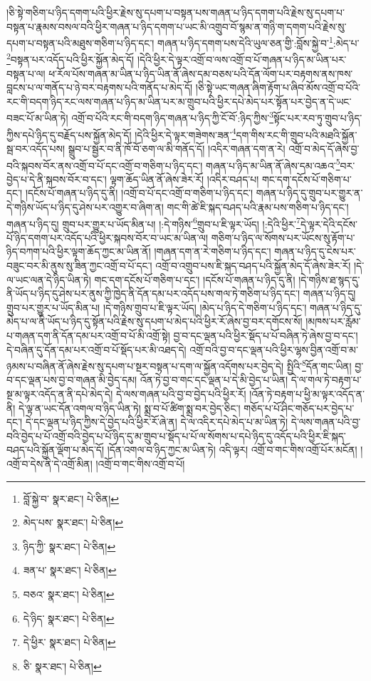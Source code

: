 །ཅི་སྟེ་གཅིག་པ་ཉིད་དགག་པའི་ཕྱིར་རྗེས་སུ་དཔག་པ་བསྟན་པས་གཞན་པ་ཉིད་དགག་པའི་རྗེས་སུ་དཔག་པ་བསྟན་པ་རྣམས་བསལ་བའི་ཕྱིར་གཞན་པ་ཉིད་དགག་པ་ཡང་མི་འགྲུབ་བོ་སྙམ་ན་གཉི་ག་དགག་པའི་རྗེས་སུ་དཔག་པ་བསྟན་པའི་མཐུས་གཅིག་པ་ཉིད་དང་། གཞན་པ་ཉིད་དགག་པས་དེའི་ཡུལ་ཅན་གྱི་:བློས་སྐྱེ་བ་\footnote{བློ་སྐྱེ་བ་  སྣར་ཐང་།  པེ་ཅིན། }:མེད་པ་\footnote{མེད་པས་  སྣར་ཐང་།  པེ་ཅིན། }བསྟན་པར་འདོད་པའི་ཕྱིར་སྐྱོན་མེད་དོ། །དེའི་ཕྱིར་དེ་ལྟར་འགྲོ་བ་ལས་འགྲོ་བ་པོ་གཞན་པ་ཉིད་མ་ཡིན་པར་བསྟན་པ་ལ། ཕ་རོལ་པོས་གཞན་མ་ཡིན་པ་ཉིད་ཡིན་ནོ་ཞེས་དམ་བཅས་པའི་དོན་ལོག་པར་བརྟགས་ནས་ཁས་བླངས་པ་ལ་གནོད་པ་ཉེ་བར་བརྟགས་པའི་གནོད་པ་མེད་དོ། །ཅི་སྟེ་ཡང་གཞན་ཞིག་རྟོག་པ་ཞིབ་མོས་འགྲོ་བ་པོའི་རང་གི་བདག་ཉིད་རང་ལས་གཞན་པ་ཉིད་མ་ཡིན་པར་མ་གྲུབ་པའི་ཕྱིར་དཔེ་མེད་པར་སྟོན་པར་བྱེད་ན་དེ་ཡང་བཟང་པོ་མ་ཡིན་ཏེ། འགྲོ་བ་པོའི་རང་གི་བདག་ཉིད་གཞན་པ་ཉིད་ཀྱི་ངོ་བོ་:ཉིད་ཀྱིས་\footnote{ཉིད་ཀྱི་  སྣར་ཐང་།  པེ་ཅིན། }སྟོང་པར་རབ་ཏུ་གྲུབ་པ་ཉིད་ཀྱིས་དཔེ་ཉིད་དུ་བརྗོད་པས་སྐྱོན་མེད་དོ། །དེའི་ཕྱིར་དེ་ལྟར་གཟེགས་ཟན་\footnote{ཟན་པ་  སྣར་ཐང་།  པེ་ཅིན། }དག་གིས་རང་གི་གྲུབ་པའི་མཐའི་སྐྱོན་སྦ་བར་འདོད་པས། སྒྲུབ་པ་སྦྱར་བ་ནི་ཁོ་བོ་ཅག་ལ་མི་གནོད་དོ། །འདིར་གཞན་དག་ན་རེ། འགྲོ་བ་མེད་དོ་ཞེས་བྱ་བའི་སྐབས་བོར་ནས་འགྲོ་བ་པོ་དང་འགྲོ་བ་གཅིག་པ་ཉིད་དང་། གཞན་པ་ཉིད་མ་ཡིན་ནོ་ཞེས་དམ་འཆའ་\footnote{བཅའ་  སྣར་ཐང་།  པེ་ཅིན། }བར་བྱེད་པ་དེ་ནི་སྐབས་བོར་བ་དང་། ལྟག་ཆོད་ཡིན་ནོ་ཞེས་ཟེར་རོ། །འདིར་བཤད་པ། གང་དག་དངོས་པོ་གཅིག་པ་དང་། །དངོས་པོ་གཞན་པ་ཉིད་དུ་ནི། །འགྲོ་བ་པོ་དང་འགྲོ་བ་གཅིག་པ་ཉིད་དང་། གཞན་པ་ཉིད་དུ་གྲུབ་པར་གྱུར་ན་དེ་གཉིས་ཡོད་པ་ཉིད་དུ་ཤེས་པར་འགྱུར་བ་ཞིག་ན། གང་གི་ཚེ་ཇི་སྐད་བཤད་པའི་རྣམ་པས་གཅིག་པ་ཉིད་དང་། གཞན་པ་ཉིད་དུ། གྲུབ་པར་གྱུར་པ་ཡོད་མིན་པ། །:དེ་གཉིས་\footnote{དེ་ཉིད་  སྣར་ཐང་།  པེ་ཅིན། }གྲུབ་པ་ཇི་ལྟར་ཡོད། །:དེའི་ཕྱིར་\footnote{དེ་ཕྱིར་  སྣར་ཐང་།  པེ་ཅིན། }དེ་ལྟར་དེའི་དངོས་པོ་ཉིད་དགག་པར་འདོད་པའི་ཕྱིར་སྐབས་བོར་བ་ཡང་མ་ཡིན་ལ། གཅིག་པ་ཉིད་ལ་སོགས་པར་ཡོངས་སུ་རྟོག་པ་ཉིད་བཀག་པའི་ཕྱིར་ལྟག་ཆོད་ཀྱང་མ་ཡིན་ནོ། །གཞན་དག་ན་རེ་གཅིག་པ་ཉིད་དང་། གཞན་པ་ཉིད་དུ་ངེས་པར་བཟུང་བར་མི་ནུས་སུ་ཟིན་ཀྱང་འགྲོ་བ་པོ་དང་། འགྲོ་བ་འགྲུབ་པས་ཇི་སྐད་བཤད་པའི་སྐྱོན་མེད་དོ་ཞེས་ཟེར་རོ། །དེ་ལ་ཡང་ལན་དེ་ཉིད་ཡིན་ཏེ། གང་དག་དངོས་པོ་གཅིག་པ་དང་། །དངོས་པོ་གཞན་པ་ཉིད་དུ་ནི། །དེ་གཉིས་ཐ་སྙད་དུ་ནི་ཡོད་པ་ཉིད་དུ་ཤེས་པར་ནུས་ཀྱི་ཁྱེད་ནི་དོན་དམ་པར་འདོད་པས་གལ་ཏེ་གཅིག་པ་ཉིད་དང་། གཞན་པ་ཉིད་དུ། གྲུབ་པར་གྱུར་པ་ཡོད་མིན་པ། །དེ་གཉིས་གྲུབ་པ་ཇི་ལྟར་ཡོད། །མེད་པ་ཉིད་དེ་གཅིག་པ་ཉིད་དང་། གཞན་པ་ཉིད་དུ་མེད་པ་ལ་ནི་ཡོད་པ་ཉིད་དུ་སྟོན་པའི་རྗེས་སུ་དཔག་པ་མེད་པའི་ཕྱིར་རོ་ཞེས་བྱ་བར་དགོངས་སོ། །མཁས་པར་རློམ་པ་གཞན་དག་ནི་དོན་དམ་པར་འགྲོ་བ་པོ་མི་འགྲོ་སྟེ། བྱ་བ་དང་ལྡན་པའི་ཕྱིར་སྡོད་པ་པོ་བཞིན་ཏེ་ཞེས་བྱ་བ་དང་། དེ་བཞིན་དུ་དོན་དམ་པར་འགྲོ་བ་པོ་སྡོད་པར་མི་འཐད་དེ། འགྲོ་བའི་བྱ་བ་དང་ལྡན་པའི་ཕྱིར་ལྷས་བྱིན་འགྲོ་བ་མ་ཉམས་པ་བཞིན་ནོ་ཞེས་རྗེས་སུ་དཔག་པ་སྔར་བསྟན་པ་དག་ལ་སྐྱོན་འདོགས་པར་བྱེད་དེ། སྤྱིའི་\footnote{ཅི་  སྣར་ཐང་།  པེ་ཅིན། }དོན་གང་ཡིན། བྱ་བ་དང་ལྡན་པས་བྱ་བ་གཞན་མི་བྱེད་དམ། འོན་ཏེ་བྱ་བ་གང་དང་ལྡན་པ་དེ་མི་བྱེད་པ་ཡིན། དེ་ལ་གལ་ཏེ་བརྟག་པ་སྔ་མ་ལྟར་འདོད་ན་ནི་དཔེ་མེད་དེ། དེ་ལས་གཞན་པའི་བྱ་བ་བྱེད་པའི་ཕྱིར་རོ། །འོན་ཏེ་བརྟག་པ་ཕྱི་མ་ལྟར་འདོད་ན་ནི། དེ་ལྟ་ན་ཡང་དོན་འགལ་བ་ཉིད་ཡིན་ཏེ། སྨྲ་བ་པོ་ཚིག་སྨྲ་བར་བྱེད་ཅིང་། གཅོད་པ་པོ་ཤིང་གཅོད་པར་བྱེད་པ་དང་། དེ་དང་ལྡན་པ་ཉིད་ཀྱིས་དེ་བྱེད་པའི་ཕྱིར་རོ་ཞེ་ན། དེ་ལ་འདིར་དཔེ་མེད་པ་མ་ཡིན་ཏེ། དེ་ལས་གཞན་པའི་བྱ་བའི་བྱེད་པ་པོ་འགྲོ་བའི་བྱེད་པ་པོ་ཉིད་དུ་མ་གྲུབ་པ་སྡོད་པ་པོ་ལ་སོགས་པ་དཔེ་ཉིད་དུ་འདོད་པའི་ཕྱིར་ཇི་སྐད་བཤད་པའི་སྐྱོན་ལྡོག་པ་མེད་དོ། །དོན་འགལ་བ་ཉིད་ཀྱང་མ་ཡིན་ཏེ། འདི་ལྟར། འགྲོ་བ་གང་གིས་འགྲོ་པོར་མངོན། །འགྲོ་བ་དེས་ནི་དེ་འགྲོ་མིན། །འགྲོ་བ་གང་གིས་འགྲོ་བ་པོ། 